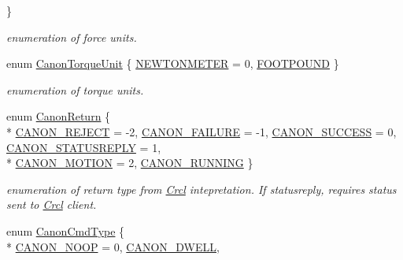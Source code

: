 \begin{DoxyCompactItemize}
 \}
\begin{DoxyCompactList}\small\item\em enumeration of force units. \end{DoxyCompactList}\item 
enum \hyperlink{namespaceRCS_aad43ee626dc2b93364a9276cd0190b38}{Canon\-Torque\-Unit} \{ \hyperlink{namespaceRCS_aad43ee626dc2b93364a9276cd0190b38a8455a50078c65f9939ae9093d87df9ce}{N\-E\-W\-T\-O\-N\-M\-E\-T\-E\-R} = 0, 
\hyperlink{namespaceRCS_aad43ee626dc2b93364a9276cd0190b38a90a01e4c469158168e9bbfed53909fa4}{F\-O\-O\-T\-P\-O\-U\-N\-D}
 \}
\begin{DoxyCompactList}\small\item\em enumeration of torque units. \end{DoxyCompactList}\item 
enum \hyperlink{namespaceRCS_a604ddc76f1c860e79ec060339a68dc79}{Canon\-Return} \{ \\*
\hyperlink{namespaceRCS_a604ddc76f1c860e79ec060339a68dc79ae784c3b29210b49f3548ad8ccbe35688}{C\-A\-N\-O\-N\-\_\-\-R\-E\-J\-E\-C\-T} = -\/2, 
\hyperlink{namespaceRCS_a604ddc76f1c860e79ec060339a68dc79a8046a92ede63076a4b9c98aa4099e3ea}{C\-A\-N\-O\-N\-\_\-\-F\-A\-I\-L\-U\-R\-E} = -\/1, 
\hyperlink{namespaceRCS_a604ddc76f1c860e79ec060339a68dc79a45f0039600f4e6b521a58e021609ea22}{C\-A\-N\-O\-N\-\_\-\-S\-U\-C\-C\-E\-S\-S} = 0, 
\hyperlink{namespaceRCS_a604ddc76f1c860e79ec060339a68dc79ae5d8cf70f462c3e4aee8050f308132fb}{C\-A\-N\-O\-N\-\_\-\-S\-T\-A\-T\-U\-S\-R\-E\-P\-L\-Y} = 1, 
\\*
\hyperlink{namespaceRCS_a604ddc76f1c860e79ec060339a68dc79a5eb43a35f73ab11edc5d5a28b908257e}{C\-A\-N\-O\-N\-\_\-\-M\-O\-T\-I\-O\-N} = 2, 
\hyperlink{namespaceRCS_a604ddc76f1c860e79ec060339a68dc79a01dce2ee696426c95a68ffe191ccd643}{C\-A\-N\-O\-N\-\_\-\-R\-U\-N\-N\-I\-N\-G}
 \}
\begin{DoxyCompactList}\small\item\em enumeration of return type from \hyperlink{namespaceCrcl}{Crcl} intepretation. If statusreply, requires status sent to \hyperlink{namespaceCrcl}{Crcl} client. \end{DoxyCompactList}\item 
enum \hyperlink{namespaceRCS_a55bbd74afb87a330de1b95af65f4cb75}{Canon\-Cmd\-Type} \{ \\*
\hyperlink{namespaceRCS_a55bbd74afb87a330de1b95af65f4cb75aec778933c8e1af18ea16550268eebaaa}{C\-A\-N\-O\-N\-\_\-\-N\-O\-O\-P} = 0, 
\hyperlink{namespaceRCS_a55bbd74afb87a330de1b95af65f4cb75a39055f1d78c4ea71a7eb300b059dc330}{C\-A\-N\-O\-N\-\_\-\-D\-W\-E\-L\-L}, 

\end{DoxyCompactItemize}
